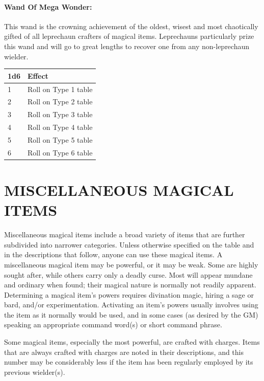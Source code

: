 \begin{multicols}{2}

\paragraph{Wand Of Mega Wonder:} This wand is the crowning achievement of the oldest, wisest and most chaotically gifted of all leprechaun crafters of magical items.  Leprechauns particularly prize this wand and will go to great lengths to recover one from any non-leprechaun wielder.

\noindent
\begin{tabular}{|p{}|p{}|}
\hline
1d6	& Effect \\
\hline\hline
\rowcolor[gray]{.9}1	& Roll on Type 1 table \\
2	& Roll on Type 2 table \\
\rowcolor[gray]{.9}3	& Roll on Type 3 table \\
4	& Roll on Type 4 table \\
\rowcolor[gray]{.9}5	& Roll on Type 5 table \\
6	& Roll on Type 6 table \\
\hline
\end{tabular}

\section{MISCELLANEOUS MAGICAL ITEMS}

Miscellaneous magical items include a broad variety of items that are further subdivided into narrower categories.  Unless otherwise specified on the table and in the descriptions that follow, anyone can use these magical items.  A miscellaneous magical item may be powerful, or it may be weak.  Some are highly sought after, while others carry only a deadly curse.  Most will appear mundane and ordinary when found; their magical nature is normally not readily apparent.  Determining a magical item's powers requires divination magic, hiring a sage or bard, and/or experimentation.  Activating an item's powers usually involves using the item as it normally would be used, and in some cases (as desired by the GM) speaking an appropriate command word(s) or short command phrase.

Some magical items, especially the most powerful, are crafted with charges.  Items that are always crafted with charges are noted in their descriptions, and this number may be considerably less if the item has been regularly employed by its previous wielder(s).  


\end{multicols}
